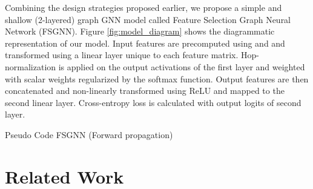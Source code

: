 \documentclass[sigconf,natbib=false]{acmart}
\begin{document}
Combining the design strategies proposed earlier, we propose a simple and shallow (2-layered) graph GNN model called Feature Selection Graph Neural Network (FSGNN). Figure \ref{fig:model_diagram} shows the diagrammatic representation of our model. Input features are precomputed using  and  and transformed using a linear layer unique to each feature matrix. Hop-normalization is applied on the output activations of the first layer and weighted with scalar weights regularized by the softmax function. Output features are then concatenated and non-linearly transformed using ReLU and mapped to the second linear layer. Cross-entropy loss is calculated with output logits of second layer.



\setlength{\textfloatsep}{1mm}
\begin{algorithm}[h!]
\DontPrintSemicolon
\caption{Pseudo Code FSGNN (Forward propagation)}
\label{alg:fsgnn}
    \BlankLine
     \;
     \;
     \;
     \;
     \;

    \For{}{
         \;
         \;
         \;
         \;
        }
    \;
    \For{}{
         \;
         \;
         \;
    }
     \;
    


\end{algorithm}




\section{Related Work}
\label{related_work}
\end{document}

